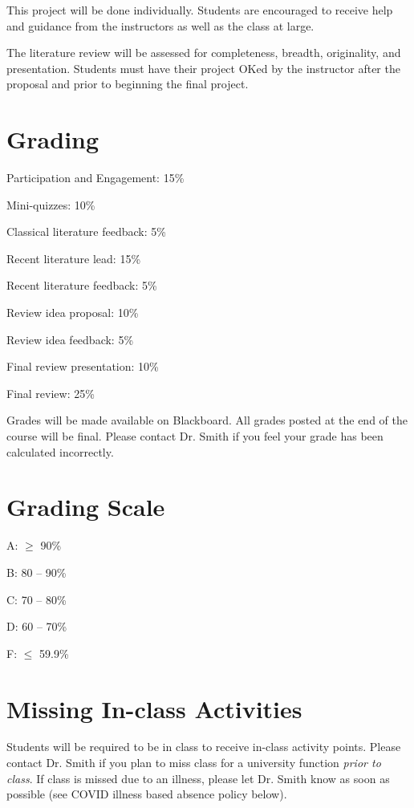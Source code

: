 \documentclass[12pt, notitlepage]{article}   	%
\begin{document}
{This project will be done individually. Students are encouraged to receive help and guidance 
from the instructors as well as the class at large. 

The literature review will be assessed for completeness, breadth, originality, and presentation.
Students must have their project OKed by the instructor after the proposal and prior to
beginning the final project.

\section{Grading}
Participation and Engagement: 15\% \par
Mini-quizzes: 10\% \par
Classical literature feedback: 5\% \par
Recent literature lead: 15\% \par
Recent literature feedback: 5\% \par
Review idea proposal: 10\% \par
Review idea feedback: 5\% \par
Final review presentation: 10\% \par
Final review: 25\% \par

Grades will be made available on Blackboard. 
All grades posted at the end of the course will be final.
Please contact Dr. Smith if you feel your grade has been calculated incorrectly.

\section{Grading Scale}
A: $\geq$ 90\% \par
B: 80 – 90\% \par
C: 70 – 80\% \par
D: 60 – 70\% \par
F: $\leq$ 59.9\% \par

\section{Missing In-class Activities}
Students will be required to be in class to receive in-class activity points. 
Please contact Dr. Smith if you plan to miss class for a university function 
\textit{prior to class}. If class is missed due to an illness, 
please let Dr. Smith know as soon as possible (see COVID illness based absence policy below).

}
\end{document}
